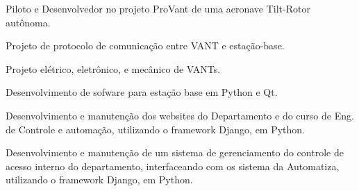 \documentclass[A4]{deedy-resume} %
\begin{document}
\begin{minipage}[t]{0.66\textwidth}
\vspace{\topsep} %


\vspace{\topsep} %
\begin{tightitemize}
 \item Piloto e Desenvolvedor no projeto ProVant de uma aeronave Tilt-Rotor autônoma.
 \item Projeto de protocolo de comunicação entre VANT e estação-base.
 \item Projeto elétrico, eletrônico, e mecânico de VANTs.
 \item Desenvolvimento de sofware para estação base em Python e Qt.
%
%
\end{tightitemize}

\sectionspace %



\vspace{\topsep} %
\begin{tightitemize}
 \item Desenvolvimento e manutenção dos websites do Departamento e do curso de Eng. de Controle e automação, utilizando o framework Django, em Python.
\end{tightitemize}

\sectionspace %

\vspace{\topsep} %
\begin{tightitemize}
 \item Desenvolvimento e manutenção de um sistema de gerenciamento do controle de acesso interno do departamento, interfaceando com os sistema da Automatiza, utilizando o framework Django, em Python.
\end{tightitemize}


\end{minipage}
\end{document}
